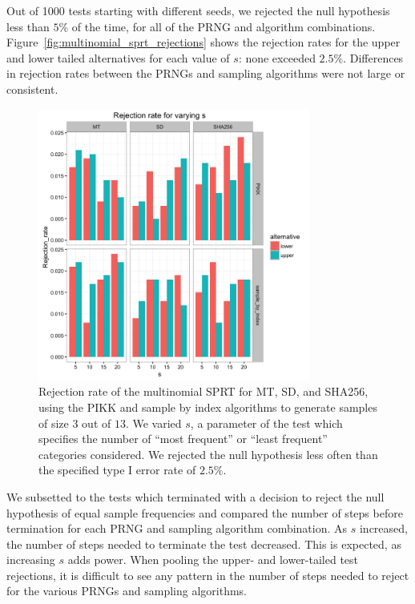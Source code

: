 \documentclass[12pt]{article}
\begin{document}
Out of 1000 tests starting with different seeds, we rejected the null hypothesis less than $5\%$ of the time, for all of the PRNG and algorithm combinations. 
Figure~\ref{fig:multinomial_sprt_rejections} shows the rejection rates for the upper and lower tailed alternatives for each value of $s$: none exceeded $2.5\%$.
Differences in rejection rates between the PRNGs and sampling algorithms were not large or consistent.


\begin{figure}[h]
\begin{center}
\includegraphics[width=0.8\textwidth]{fig/sprt-multinomial-rejection-rate.png}
\caption{Rejection rate of the multinomial SPRT for MT, SD, and SHA256, using the PIKK and sample by index algorithms to generate samples of size $3$ out of $13$. We varied $s$, a parameter of the test which specifies the number of ``most frequent'' or ``least frequent'' categories considered.  We rejected the null hypothesis less often than the specified type I error rate of $2.5\%$.}
\end{center}
\end{figure}

We subsetted to the tests which terminated with a decision to reject the null hypothesis of equal sample frequencies and compared the number of steps before termination for each PRNG and sampling algorithm combination. 
As $s$ increased, the number of steps needed to terminate the test decreased. 
This is expected, as increasing $s$ adds power. 
When pooling the upper- and lower-tailed test rejections, it is difficult to see any pattern in the number of steps needed to reject for the various PRNGs and sampling algorithms. 
\end{document}
